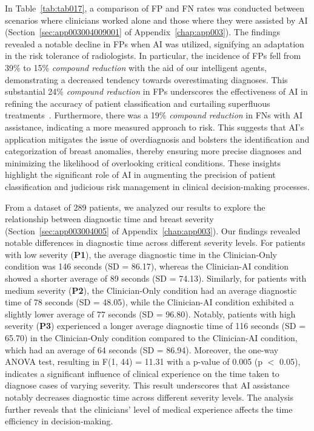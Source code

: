 \textcolor{revised}{In Table~\ref{tab:tab017}, a comparison of \ac{FP} and \ac{FN} rates was conducted between scenarios where clinicians worked alone and those where they were assisted by \ac{AI} (Section~\ref{sec:app003004009001} of Appendix~\ref{chap:app003}).
The findings revealed a notable decline in \acp{FP} when \ac{AI} was utilized, signifying an adaptation in the risk tolerance of radiologists.
In particular, the incidence of \acp{FP} fell from 39\% to 15\% \textcolor{revised}{{\it compound reduction}} with the aid of our intelligent agents, demonstrating a decreased tendency towards overestimating diagnoses.
This substantial 24\% \textcolor{revised}{{\it compound reduction}} in \acp{FP} underscores the effectiveness of \ac{AI} in refining the accuracy of patient classification and curtailing superfluous treatments~\cite{10.1001/jamainternmed.2014.981}.
Furthermore, there was a 19\% \textcolor{revised}{{\it compound reduction}} in \acp{FN} with \ac{AI} assistance, indicating a more measured approach to risk.
This suggests that \ac{AI}'s application mitigates the issue of overdiagnosis and bolsters the identification and categorization of breast anomalies, thereby ensuring more precise diagnoses and minimizing the likelihood of overlooking critical conditions.
These insights highlight the significant role of \ac{AI} in augmenting the precision of patient classification and judicious risk management in clinical decision-making processes.}



From a dataset of 289 patients, we analyzed our results to explore the relationship between diagnostic time and breast severity (Section~\ref{sec:app003004005} of Appendix~\ref{chap:app003}).
Our findings revealed notable differences in diagnostic time across different severity levels.
For patients with low severity ({\bf P1}), the average diagnostic time in the Clinician-Only condition was 146 seconds (SD = 86.17), whereas the Clinician-AI condition showed a shorter average of 89 seconds (SD = 74.13).
Similarly, for patients with medium severity ({\bf P2}), the Clinician-Only condition had an average diagnostic time of 78 seconds (SD = 48.05), while the Clinician-AI condition exhibited a slightly lower average of 77 seconds (SD = 96.80).
Notably, patients with high severity ({\bf P3}) experienced a longer average diagnostic time of 116 seconds (SD = 65.70) in the Clinician-Only condition compared to the Clinician-AI condition, which had an average of 64 seconds (SD = 86.94).
\textcolor{revised}{Moreover, the one-way \ac{ANOVA} test, resulting in F(1, 44) = 11.31 with a p-value of 0.005 (p $<$ 0.05), indicates a significant influence of clinical experience on the time taken to diagnose cases of varying severity.
This result underscores that \ac{AI} assistance notably decreases diagnostic time across different severity levels.
The analysis further reveals that the clinicians' level of medical experience affects the time efficiency in decision-making.}

